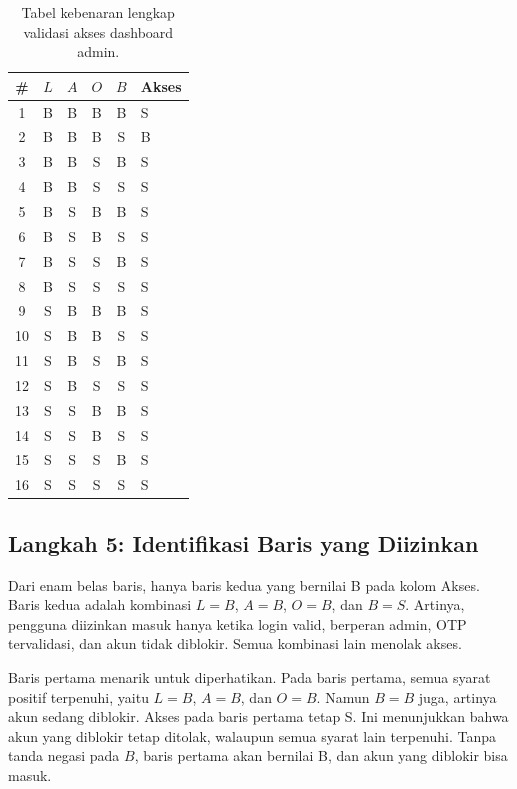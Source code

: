 \documentclass[11pt,a4paper]{article}
\begin{document}
\begin{table}[H]
	\centering
	\caption{Tabel kebenaran lengkap validasi akses dashboard admin.}
	\label{tab:dashboard-16}
	\footnotesize
	\begin{tabular}{c c c c c l}
		\toprule
		\# & $L$ & $A$ & $O$ & $B$ & Akses \\
		\midrule
		1 & B & B & B & B & S \\
		2 & B & B & B & S & B \\
		3 & B & B & S & B & S \\
		4 & B & B & S & S & S \\
		5 & B & S & B & B & S \\
		6 & B & S & B & S & S \\
		7 & B & S & S & B & S \\
		8 & B & S & S & S & S \\
		9 & S & B & B & B & S \\
		10 & S & B & B & S & S \\
		11 & S & B & S & B & S \\
		12 & S & B & S & S & S \\
		13 & S & S & B & B & S \\
		14 & S & S & B & S & S \\
		15 & S & S & S & B & S \\
		16 & S & S & S & S & S \\
		\bottomrule
	\end{tabular}
\end{table}

\subsection{Langkah 5: Identifikasi Baris yang Diizinkan}

Dari enam belas baris, hanya baris kedua yang bernilai B pada kolom Akses. Baris kedua adalah kombinasi $L=B$, $A=B$, $O=B$, dan $B=S$. Artinya, pengguna diizinkan masuk hanya ketika login valid, berperan admin, OTP tervalidasi, dan akun tidak diblokir. Semua kombinasi lain menolak akses.

Baris pertama menarik untuk diperhatikan. Pada baris pertama, semua syarat positif terpenuhi, yaitu $L=B$, $A=B$, dan $O=B$. Namun $B=B$ juga, artinya akun sedang diblokir. Akses pada baris pertama tetap S. Ini menunjukkan bahwa akun yang diblokir tetap ditolak, walaupun semua syarat lain terpenuhi. Tanpa tanda negasi pada $B$, baris pertama akan bernilai B, dan akun yang diblokir bisa masuk.
\end{document}
